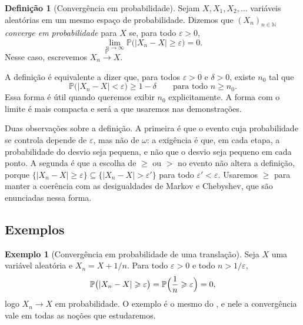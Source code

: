 \documentclass[12pt,portuguese]{article}
\theoremstyle{definition}
\newtheorem{definition}[definition]{Definição}
\newtheorem{example}[example]{Exemplo}
\theoremstyle{plainexercise}
\theoremstyle{starredexercise}
\theoremstyle{definition}
\begin{document}
\begin{definition}[Convergência em probabilidade]\label{def:prob}
Sejam $X,X_1,X_2,\ldots$ variáveis aleatórias em um mesmo espaço de
probabilidade. Dizemos que $(X_n)_{n\in\mathbb{N}}$ \emph{converge em probabilidade} para $X$ se,
para todo $\varepsilon>0$,
\[
\lim_{n\to\infty}\mathbb{P}\bigl(|X_n-X|\geqslant\varepsilon\bigr)=0.
\]
Nesse caso, escrevemos $X_n\xrightarrow{\ \mathbb{P}\ }X$.
\end{definition}

A definição é equivalente a dizer que, para todos $\varepsilon>0$ e
$\delta>0$, existe $n_0$ tal que
\[
\mathbb{P}\bigl(|X_n-X|<\varepsilon\bigr)\geqslant1-\delta
\qquad\text{para todo }n\geqslant n_0.
\]
Essa forma é útil quando queremos exibir $n_0$ explicitamente. A forma com o
limite é mais compacta e será a que usaremos nas demonstrações.

Duas observações sobre a definição. A primeira é que o evento cuja
probabilidade se controla depende de $\varepsilon$, mas não de $\omega$: a
exigência é que, em cada etapa, a probabilidade do desvio seja pequena, e não
que o desvio seja pequeno em cada ponto. A segunda é que a escolha de
$\geqslant$ ou $>$ no evento não altera a definição, porque
$\{|X_n-X|\geqslant\varepsilon\}\subseteq\{|X_n-X|>\varepsilon'\}$ para todo
$\varepsilon'<\varepsilon$. Usaremos $\geqslant$ para manter a coerência com as
desigualdades de Markov e Chebyshev, que são enunciadas nessa forma.

\subsection{Exemplos}\label{subsec:prob-exemplos}

\begin{example}[Convergência em probabilidade de uma translação]\label{ex:prob-translacao}
Seja $X$ uma variável aleatória e $X_n=X+1/n$. Para todo $\varepsilon>0$ e todo
$n>1/\varepsilon$,
\[
\mathbb{P}\bigl(|X_n-X|\geqslant\varepsilon\bigr)
=
\mathbb{P}\Bigl(\frac{1}{n}\geqslant\varepsilon\Bigr)=0,
\]
logo $X_n\to X$ em probabilidade. O exemplo é o mesmo do
, e nele a convergência vale em todas as noções que
estudaremos.
\end{example}
\end{document}
